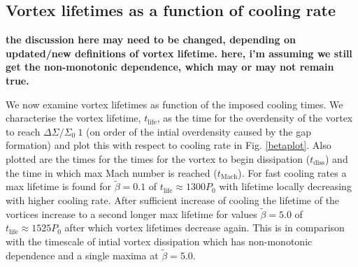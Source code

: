 
\subsection{Vortex lifetimes as a function of cooling
  rate}\label{lifetime_discuss} 
{\bf the discussion here may need to be changed, depending on
  updated/new definitions of vortex lifetime. here, i'm assuming we
  still get the non-monotonic dependence, which may or may not remain
  true. 
}

We now examine vortex lifetimes as function of the imposed cooling
times. We characterise the vortex lifetime, $t_{\mathrm{life}}$, as the time for the
 overdensity of the vortex
 to reach $\Delta \Sigma/\Sigma_0~1$ (on order of the intial overdensity caused
 by the gap formation)
and plot this with respect to cooling rate in Fig. \ref{betaplot}.
Also plotted are the times for the times for the vortex to begin dissipation
($t_{\mathrm{diss}}$) and the time in which max Mach number is reached ($t_{\mathrm{Mach}}$).
For fast cooling rates a max lifetime is found for $\tilde\beta=0.1$ of 
$t_{\mathrm{life}} \approx 1300P_0$ with lifetime locally decreasing with higher cooling rate.
After sufficient increase of cooling the lifetime of the vortices increase
to a second longer max lifetime for values $\tilde\beta=5.0$ of $t_{\mathrm{life}}\approx 1525P_0$
 after which vortex lifetimes decrease again. 
This is in comparison with the timescale of intial vortex dissipation which has 
non-monotonic dependence and a single maxima at $\tilde\beta=5.0$.


